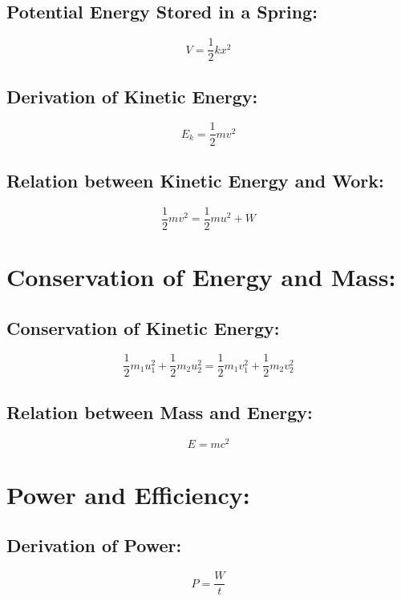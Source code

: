 \documentclass[a4paper]{report}
\begin{document}
        \subsection{Potential Energy Stored in a Spring: }
            \begin{equation}
                V = \frac{1}{2} kx^2
            \end{equation}
        \subsection{Derivation of Kinetic Energy: }
            \begin{equation}
                E_k = \frac{1}{2}mv^2
            \end{equation}
        \subsection{Relation between Kinetic Energy and Work: }
            \begin{equation}
                \frac{1}{2} mv^2 = \frac{1}{2} mu^2 + W
            \end{equation}
    \section{Conservation of Energy and Mass: }
        \subsection{Conservation of Kinetic Energy: }
            \begin{equation}
                \frac{1}{2} m_1 u_1^2 + \frac{1}{2} m_2 u_2^2 = \frac{1}{2} m_1 v_1^2 + \frac{1}{2} m_2 v_2^2
            \end{equation}
        \subsection{Relation between Mass and Energy: }
            \begin{equation}
                E = mc^2
            \end{equation}
    \section{Power and Efficiency: }
        \subsection{Derivation of Power: }
            \begin{equation}
                P = \frac{W}{t}
            \end{equation}
\end{document}
